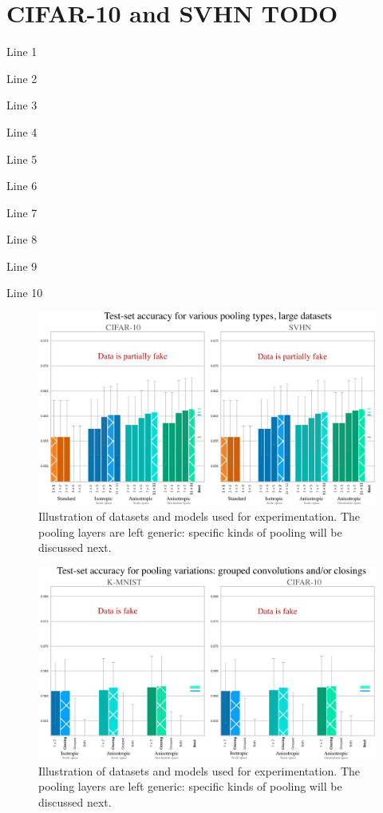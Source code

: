 \documentclass[a4paper, 12pt]{report}
\def\comment#1{\color{red}#1\color{black}}
\begin{document}
\vspace{-0.7cm}
\section{CIFAR-10 and SVHN  \comment{TODO}}
\comment{Line 1}

\comment{Line 2}

\comment{Line 3}

\comment{Line 4}

\comment{Line 5}

\comment{Line 6}

\comment{Line 7}

\comment{Line 8}

\comment{Line 9}

\comment{Line 10}

\begin{figure}[hb!]
	\center
  \includegraphics[width=1\textwidth]{figures/results-large.png}
  \caption{Illustration of datasets and models used for experimentation.
  The pooling layers are left generic: specific kinds of pooling will be discussed next. }
  \label{fig:res-large}
\end{figure}
\newpage
\begin{figure}[ht!]
	\center
  \includegraphics[width=1\textwidth]{figures/results-alt}
  \caption{Illustration of datasets and models used for experimentation.
  The pooling layers are left generic: specific kinds of pooling will be discussed next. }
  \label{fig:res-alt}
\end{figure}
\end{document}
